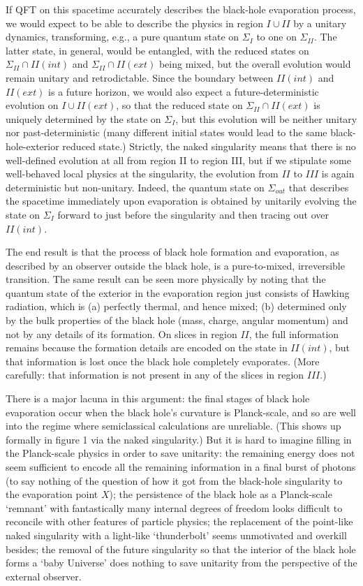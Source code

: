 \documentclass{article}
\begin{document}
If QFT on this spacetime accurately describes the black-hole evaporation process, we would expect to be able to describe the physics in region $I \cup II$ by a unitary dynamics, transforming, e.g., a pure quantum state on $\Sigma_I$ to one on $\Sigma_{II}$. The latter state, in general, would be entangled, with the reduced states on $\Sigma_{II} \cap II(int)$ and $\Sigma_{II} \cap II(ext)$ being mixed, but the overall evolution would remain unitary and retrodictable. Since the boundary between $II(int)$ and $II(ext)$ is a future horizon, we would also expect a future-deterministic evolution on $I \cup II(ext)$, so that the reduced state on $\Sigma_{II}\cap II(ext)$ is uniquely determined by the state on $\Sigma_I$, but this evolution will be neither unitary nor past-deterministic (many different initial states would lead to the same black-hole-exterior reduced state.) Strictly, the naked singularity means that there is no well-defined evolution at all from region II to region III, but if we stipulate some well-behaved local physics at the singularity, the evolution from $II$ to $III$ is again deterministic but non-unitary. Indeed, the quantum state on $\Sigma_{out}$ that describes the spacetime immediately upon evaporation is obtained by unitarily evolving the state on $\Sigma_I$ forward to just before the singularity and then tracing out over $II(int)$.

The end result is that the process of black hole formation and evaporation, as described by an observer outside the black hole, is a pure-to-mixed, irreversible transition. The same result can be seen more physically by noting that the quantum state of the exterior in the evaporation region just consists of Hawking radiation, which is (a) perfectly thermal, and hence mixed; (b) determined only by the bulk properties of the black hole (mass, charge, angular momentum) and not by any details of its formation. On slices in region $II$, the full information remains because the formation details are encoded on the state in $II(int)$, but that information is lost once the black hole completely evaporates. (More carefully: that information is not present in any of the slices in region $III$.)

There is a major lacuna in this argument: the final stages of black hole evaporation occur when the black hole's curvature is Planck-scale, and so are well into the regime where semiclassical calculations are unreliable. (This shows up formally in figure 1 via the naked singularity.) But it is hard to imagine filling in the Planck-scale physics in order to save unitarity: the remaining energy does not seem sufficient to encode all the remaining information in a final burst of photons (to say nothing of the question of how it got from the black-hole singularity to the evaporation point $X$); the persistence of the black hole as a Planck-scale `remnant' with fantastically many internal degrees of freedom looks difficult to reconcile with other features of particle physics; the replacement of the point-like naked singularity with a light-like `thunderbolt' seems unmotivated and overkill besides; the removal of the future singularity so that the interior of the black hole forms a `baby Universe' does nothing to save unitarity from the perspective of the external observer.
\end{document}
